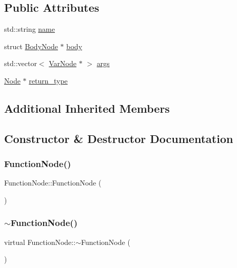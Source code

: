 \subsection*{Public Attributes}
\begin{DoxyCompactItemize}
\item 
std\+::string \hyperlink{classFunctionNode_a21284dd655c91da1f792dc3bc1bba60c}{name}
\item 
struct \hyperlink{classBodyNode}{Body\+Node} $\ast$ \hyperlink{classFunctionNode_a3ebe1489837aee643b7e9f626ef0976a}{body}
\item 
std\+::vector$<$ \hyperlink{classVarNode}{Var\+Node} $\ast$ $>$ \hyperlink{classFunctionNode_a04bfceaf29255ffd83195f669b5c37ef}{args}
\item 
\hyperlink{classNode}{Node} $\ast$ \hyperlink{classFunctionNode_a52768e57ce61d19f974c5c7412168377}{return\+\_\+type}
\end{DoxyCompactItemize}
\subsection*{Additional Inherited Members}


\subsection{Constructor \& Destructor Documentation}
\mbox{\label{classFunctionNode_ac4467a4c13382e0058cb2bd4fb70e0ab}} 
\subsubsection{\texorpdfstring{Function\+Node()}{FunctionNode()}}
{\footnotesize\ttfamily Function\+Node\+::\+Function\+Node (\begin{DoxyParamCaption}{ }\end{DoxyParamCaption})}

\mbox{\label{classFunctionNode_ad9c4a35db175de9386ac86d91a1a95df}} 
\subsubsection{\texorpdfstring{$\sim$\+Function\+Node()}{~FunctionNode()}}
{\footnotesize\ttfamily virtual Function\+Node\+::$\sim$\+Function\+Node (\begin{DoxyParamCaption}{ }\end{DoxyParamCaption})\hspace{0.3cm}{\ttfamily [virtual]}}



